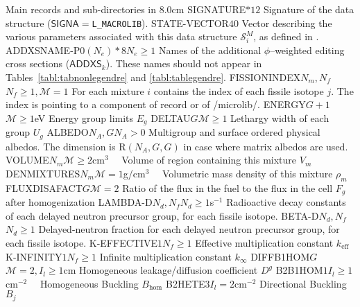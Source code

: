 \begin{DescriptionEnregistrement}{Main records and sub-directories in }{8.0cm}
\CharEnr
  {SIGNATURE}{$*12$}
  {Signature of the  data structure ($\mathsf{SIGNA}=${\tt L\_MACROLIB}).}
\IntEnr
  {STATE-VECTOR}{$40$}
  {Vector describing the various parameters associated with this data structure
  $\mathcal{S}^{M}_{i}$, as defined in .}
\OptCharEnr
  {ADDXSNAME-P0}{$(N_{e})*8$}{$N_{e} \ge 1$}
  {Names of the additional $\phi$--weighted editing cross sections ($\mathsf{ADDXS}_k$).
  These names should not appear in Tables~\ref{tabl:tabnonlegendre} and \ref{tabl:tablegendre}.}
\OptIntEnr
  {FISSIONINDEX}{$N_{m},N_{f}$}{$N_{f} \ge 1,\mathcal{M}=1$}
  {For each mixture $i$ contains the index of each fissile isotope $j$. The index is
   pointing to a component of record  or 
   of /microlib/.}
\OptRealEnr
  {ENERGY}{$G+1$}{$\mathcal{M}\ge 1$}{eV}
  {Energy group limits $E_{g}$}
\OptRealEnr
  {DELTAU}{$G$}{$\mathcal{M}\ge 1$}{}
  {Lethargy width of each group $U_{g}$}
\OptRealEnr
  {ALBEDO}{$N_{A}, G$}{$N_{A}> 0$}{}
  {Multigroup and surface ordered physical albedos. The dimension is R$(N_{A},G,G)$ in case where matrix albedos are used.}
\OptRealEnr
  {VOLUME}{$N_{m}$}{$\mathcal{M}\ge 2$}{cm$^{3}$~~}
  {Volume of region containing this mixture $V_{m}$}
\OptRealEnr
  {DENMIXTURES}{$N_{m}$}{$\mathcal{M}= 1$}{g/cm$^{3}$~~}
  {Volumetric mass density of this mixture $\rho_{m}$}  
\OptRealEnr
  {FLUXDISAFACT}{$G$}{$\mathcal{M}=2$}{}
  {Ratio of the flux in the fuel to the flux in the cell $F_{g}$ after homogenization}
\OptRealEnr
  {LAMBDA-D}{$N_{d},N_{f}$}{$N_{d}\ge 1$}{s$^{-1}$}
  {Radioactive decay constants of each delayed neutron precursor group, for each
  fissile isotope.}
\OptRealEnr
  {BETA-D}{$N_{d},N_{f}$}{$N_{d}\ge 1$}{}
  {Delayed-neutron fraction for each delayed neutron precursor group, for each
  fissile isotope.}
\OptRealEnr
  {K-EFFECTIVE}{$1$}{$N_{f} \ge 1$}{}
  {Effective multiplication constant $k_{\mathrm{eff}}$}
\OptRealEnr
  {K-INFINITY}{$1$}{$N_{f} \ge 1$}{}
  {Infinite multiplication constant $k_{\infty}$}
\OptRealEnr
  {DIFFB1HOM}{$G$}{$\mathcal{M}=2,I_{l} \ge 1$}{cm}
  {Homogeneous leakage/diffusion coefficient $D^{g}$}
\OptRealEnr
  {B2B1HOM}{$1$}{$I_{l} \ge 1$}{cm$^{-2}$~~}
  {Homogeneous Buckling $B_{\mathrm{hom}}$}
\OptRealEnr
  {B2HETE}{$3$}{$I_{l}=2$}{cm$^{-2}$}
  {Directional Buckling $B_{j}$}

\end{DescriptionEnregistrement}
